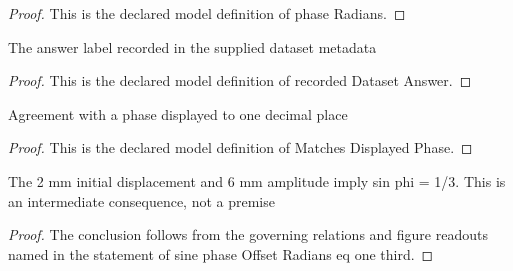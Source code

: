 \begin{proof}
  This is the declared model definition of phase Radians.
\end{proof}
\begin{definition}
  \label{def:physics:phyx-mini-0300:phyxminiproblems-problemphyxmini0300-recordeddatasetanswer}
  The answer label recorded in the supplied dataset metadata
\end{definition}
\begin{proof}
  This is the declared model definition of recorded Dataset Answer.
\end{proof}
\begin{definition}
  \label{def:physics:phyx-mini-0300:phyxminiproblems-problemphyxmini0300-matchesdisplayedphase}
  Agreement with a phase displayed to one decimal place
\end{definition}
\begin{proof}
  This is the declared model definition of Matches Displayed Phase.
\end{proof}
\begin{lemma}
  \label{lem:physics:phyx-mini-0300:phyxminiproblems-problemphyxmini0300-sine-phaseoffsetradians-eq-one-third}
  The 2 mm initial displacement and 6 mm amplitude imply sin phi = 1/3. This is an intermediate consequence, not a premise
\end{lemma}
\begin{proof}
  The conclusion follows from the governing relations and figure readouts named in the statement of sine phase Offset Radians eq one third.
\end{proof}
